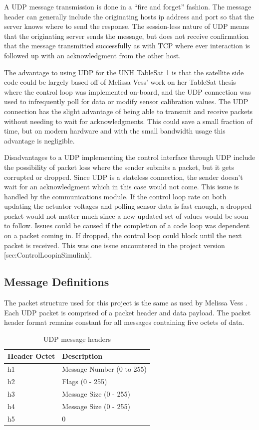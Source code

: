 A UDP message transmission is done in a ``fire and forget'' fashion.  The message header can generally include the originating hosts ip address and port so that the server knows where to send the response.  The session-less nature of UDP means that the originating server sends the message, but does not receive confirmation that the message transmitted successfully as with TCP where ever interaction is followed up with an acknowledgment from the other host.

The advantage to using UDP for the UNH TableSat 1 is that the satellite side code could be largely based off of Melissa Vess' work on her TableSat thesis where the control loop was implemented on-board, and the UDP connection was used to infrequently poll for data or modify sensor calibration values.  The UDP connection has the slight advantage of being able to transmit and receive packets without needing to wait for acknowledgments.  This could save a small fraction of time, but on modern hardware and with the small bandwidth usage this advantage is negligible.

Disadvantages to a UDP implementing the control interface through UDP include the possibility of packet loss where the sender submits a packet, but it gets corrupted or dropped.  Since UDP is a stateless connection, the sender doesn't wait for an acknowledgment which in this case would not come. This issue is handled by the communications module.  If the control loop rate on both updating the actuator voltages and polling sensor data is fast enough, a dropped packet would not matter much since a new updated set of values would be soon to follow.  Issues could be caused if the completion of a code loop was dependent on a packet coming in.  If dropped, the control loop could block until the next packet is received.  This was one issue encountered in the project version [sec:ControlLoopinSimulink].


\subsection{Message Definitions}
\label{subsec:MessageDefinitions}


The packet structure used for this project is the same as used by Melissa Vess \cite{vessthesis}. Each UDP packet is comprised of a packet header and data payload.  The packet header format remains constant for all messages containing five octets of data.

\begin{table}[H]
  \centering
  \begin{tabular}{| l | l |}
    \hline
    Header Octet & Description \\ \hline
    h1 & Message Number (0 to 255) \\ \hline
    h2 & Flags (0 - 255) \\ \hline
    h3 & Message Size (0 - 255) \\ \hline
    h4 & Message Size (0 - 255) \\ \hline
    h5 & 0 \\ \hline
  \end{tabular}
  \caption{UDP message headers}
  \label{tbl:UDPMessageHeaders}
\end{table}

